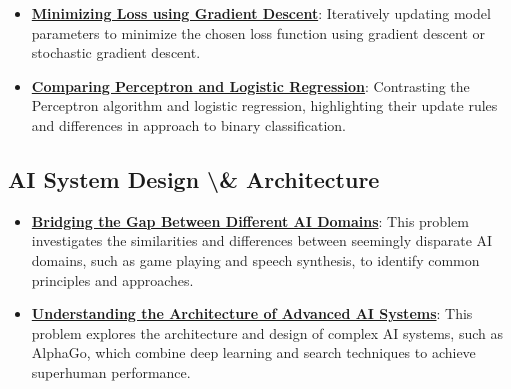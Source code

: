 \documentclass{article}%
\begin{document}
\begin{itemize}[leftmargin=*]
\item \href{https://purdue.brightspace.com/d2l/common/assets/pdfjs-d2l-dist/1.0.14-legacy/web/viewer.html?file=%2Fcontent%2Fenforced%2F1095467-wl.202510.CS.24300.001%2F05L2-ML Basics.pdf%3Fou%3D1095467&lang=en-us&container=d2l-fileviewer-rendered-pdf&fullscreen=d2l-fileviewer-rendered-pdf-dialog&height=667#page=28}{\textbf{Minimizing Loss using Gradient Descent}}: Iteratively updating model parameters to minimize the chosen loss function using gradient descent or stochastic gradient descent.%
\item \href{https://purdue.brightspace.com/d2l/common/assets/pdfjs-d2l-dist/1.0.14-legacy/web/viewer.html?file=%2Fcontent%2Fenforced%2F1095467-wl.202510.CS.24300.001%2F05L2-ML Basics.pdf%3Fou%3D1095467&lang=en-us&container=d2l-fileviewer-rendered-pdf&fullscreen=d2l-fileviewer-rendered-pdf-dialog&height=667#page=33}{\textbf{Comparing Perceptron and Logistic Regression}}: Contrasting the Perceptron algorithm and logistic regression, highlighting their update rules and differences in approach to binary classification.%
\end{itemize}

%
\subsection{AI System Design \textbackslash{}\& Architecture}%
\label{subsec:AISystemDesignArchitecture}%
\begin{itemize}[leftmargin=*]%
\item \href{https://purdue.brightspace.com/d2l/common/assets/pdfjs-d2l-dist/1.0.14-legacy/web/viewer.html?file=%2Fcontent%2Fenforced%2F1095467-wl.202510.CS.24300.001%2F02L2-Intro.pdf%3Fou%3D1095467&lang=en-us&container=d2l-fileviewer-rendered-pdf&fullscreen=d2l-fileviewer-rendered-pdf-dialog&height=667#page=31}{\textbf{Bridging the Gap Between Different AI Domains}}: This problem investigates the similarities and differences between seemingly disparate AI domains, such as game playing and speech synthesis, to identify common principles and approaches.%
\item \href{https://purdue.brightspace.com/d2l/common/assets/pdfjs-d2l-dist/1.0.14-legacy/web/viewer.html?file=%2Fcontent%2Fenforced%2F1095467-wl.202510.CS.24300.001%2F02L2-Intro.pdf%3Fou%3D1095467&lang=en-us&container=d2l-fileviewer-rendered-pdf&fullscreen=d2l-fileviewer-rendered-pdf-dialog&height=667#page=50}{\textbf{Understanding the Architecture of Advanced AI Systems}}: This problem explores the architecture and design of complex AI systems, such as AlphaGo, which combine deep learning and search techniques to achieve superhuman performance.%
\end{itemize}
\end{document}
